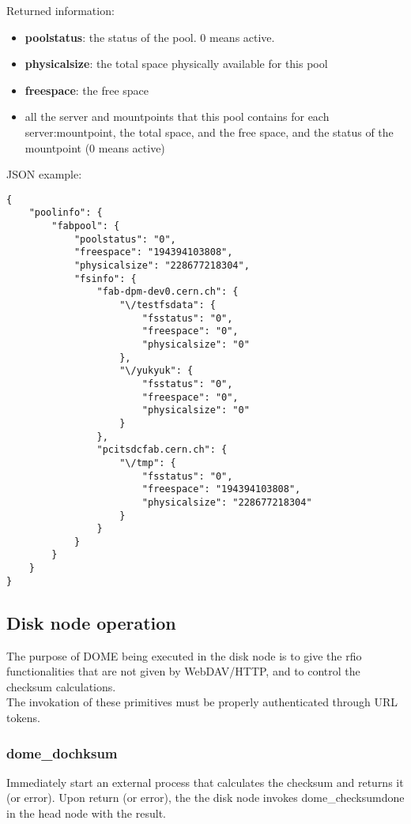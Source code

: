 \documentclass[a4paper,10pt]{scrreprt}
\begin{document}
Returned information:
\begin{itemize}
 \item \textbf{poolstatus}: the status of the pool. 0 means active.
 \item \textbf{physicalsize}: the total space physically available for this pool
 \item \textbf{freespace}: the free space
 
 
 \item all the server and mountpoints that this pool contains
 \subitem for each server:mountpoint, the total space, and the free space, and the status of the mountpoint (0 means active)
\end{itemize}

JSON example:\\
\begin{lstlisting}
{
    "poolinfo": {
        "fabpool": {
            "poolstatus": "0",
            "freespace": "194394103808",
            "physicalsize": "228677218304",
            "fsinfo": {
                "fab-dpm-dev0.cern.ch": {
                    "\/testfsdata": {
                        "fsstatus": "0",
                        "freespace": "0",
                        "physicalsize": "0"
                    },
                    "\/yukyuk": {
                        "fsstatus": "0",
                        "freespace": "0",
                        "physicalsize": "0"
                    }
                },
                "pcitsdcfab.cern.ch": {
                    "\/tmp": {
                        "fsstatus": "0",
                        "freespace": "194394103808",
                        "physicalsize": "228677218304"
                    }
                }
            }
        }
    }
}
\end{lstlisting}

\subsection{Disk node operation}
The purpose of DOME being executed in the disk node is to give the rfio functionalities that are not
given by WebDAV/HTTP, and to control the checksum calculations.\\
The invokation of these primitives must be properly authenticated through URL tokens.\\

\subsubsection{dome\_dochksum}
 Immediately start an external process that calculates the checksum and returns it (or error).
 Upon return (or error), the the disk node invokes dome\_checksumdone in the head node with the result.
 
\end{document}
